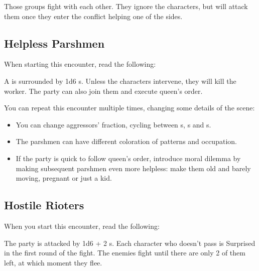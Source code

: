 Those groups fight with each other. They ignore the characters, but will attack them once they enter the conflict helping one of the sides.


\subsection{Helpless Parshmen}

When starting this encounter, read the following:


A \enemyPrshmen{} is surrounded by 1d6 \enemyRioter{}s. Unless the characters intervene, they will kill the worker. The party can also join them and execute queen's order.

You can repeat this encounter multiple times, changing some details of the scene:
\begin{itemize}
	\item You can change aggressors' fraction, cycling between \enemyRioter{}s, \enemyWallGuard{}s and \enemyCultist{}s.
	\item The parshmen can have different coloration of patterns and occupation.
	\item If the party is quick to follow queen's order, introduce moral dilemma by making subsequent parshmen even more helpless: make them old and barely moving, pregnant or just a kid.
\end{itemize}



\subsection{Hostile Rioters}

When you start this encounter, read the following:


The party is attacked by 1d6 + 2 \enemyRioter{}s. Each character who doesn't pass  is Surprised in the first round of the fight. The enemies fight until there are only 2 of them left, at which moment they flee.



